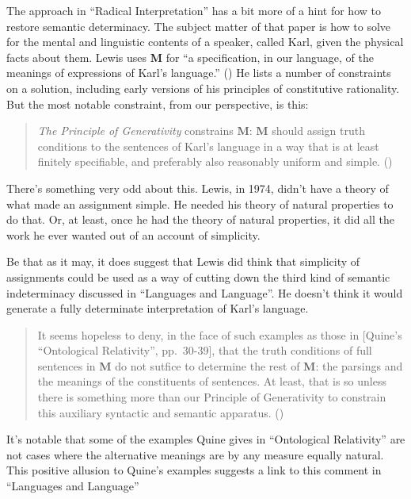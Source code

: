 \documentclass[
  10pt,
  letterpaper,
  DIV=11,
  numbers=noendperiod,
  twoside]{scrartcl}
\begin{document}
The approach in ``Radical Interpretation'' has a bit more of a hint for
how to restore semantic determinacy. The subject matter of that paper is
how to solve for the mental and linguistic contents of a speaker, called
Karl, given the physical facts about them. Lewis uses \textbf{M} for ``a
specification, in our language, of the meanings of expressions of Karl's
language.'' () He lists a
number of constraints on a solution, including early versions of his
principles of constitutive rationality. But the most notable constraint,
from our perspective, is this:

\begin{quote}
\emph{The Principle of Generativity} constrains \textbf{M}: \textbf{M}
should assign truth conditions to the sentences of Karl's language in a
way that is at least finitely specifiable, and preferably also
reasonably uniform and simple. ()
\end{quote}

There's something very odd about this. Lewis, in 1974, didn't have a
theory of what made an assignment simple. He needed his theory of
natural properties to do that. Or, at least, once he had the theory of
natural properties, it did all the work he ever wanted out of an account
of simplicity.

Be that as it may, it does suggest that Lewis did think that simplicity
of assignments could be used as a way of cutting down the third kind of
semantic indeterminacy discussed in ``Languages and Language''. He
doesn't think it would generate a fully determinate interpretation of
Karl's language.

\begin{quote}
It seems hopeless to deny, in the face of such examples as those in
{[}Quine's ``Ontological Relativity'', pp.~30-39{]}, that the truth
conditions of full sentences in \textbf{M} do not sutfice to determine
the rest of \textbf{M}: the parsings and the meanings of the
constituents of sentences. At least, that is so unless there is
something more than our Principle of Generativity to constrain this
auxiliary syntactic and semantic apparatus.
()
\end{quote}

It's notable that some of the examples Quine gives in ``Ontological
Relativity'' are not cases where the alternative meanings are by any
measure equally natural. This positive allusion to Quine's examples
suggests a link to this comment in ``Languages and Language''
\end{document}

